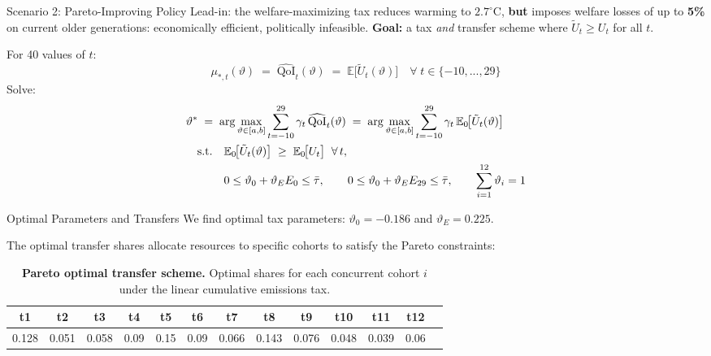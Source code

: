 \documentclass[10pt,aspectratio=169]{beamer}
\begin{document}
\begin{frame}{Scenario 2: Pareto-Improving Policy}
\footnotesize
Lead-in: the welfare-maximizing tax reduces warming to $2.7^\circ$C, \textbf{but} imposes welfare losses of up to \textbf{5\%} on current older generations: economically efficient, politically infeasible. \textbf{Goal:} a tax \textit{and} transfer scheme where $\tilde{U}_t \ge U_t$ for all $t$.

\vspace{0.2em}
For 40 values of $t$:
\begin{equation}
    \mu_{*,t}(\vartheta) \;=\; \widehat{\mathrm{QoI}}_t(\vartheta)
  \;=\;
  \mathbb{E}\!\bigl[\tilde{U}_t(\vartheta)\bigr] \quad \forall \; t \in \{-10,...,29\}
\end{equation}
Solve:
\begin{equation}
\label{eq:opt_pareto_y2}
\begin{aligned}
  &\vartheta^{\ast}
  \;=\;
  \arg\max_{\vartheta\in[a,b]}
  \sum_{t=-10}^{29}\gamma_t\, \widehat{\mathrm{QoI}}_t(\vartheta)
  \;=\;
  \arg\max_{\vartheta\in[a,b]}
  \sum_{t=-10}^{29}\gamma_t\,\mathbb{E}_0\!\bigl[\tilde{U}_t(\vartheta)\bigr] \\
& \quad \text{s.t.} \quad
 \mathbb{E}_0\!\bigl[\tilde{U}_t(\vartheta)\bigr]
  \;\ge\;
  \mathbb{E}_0\!\bigl[U_t\bigr]
  \;\;\forall\,t, \\
& \phantom{\quad \text{s.t.} \quad} 0 \leq \vartheta_0 + \vartheta_E  E_0 \leq \Bar{\tau}, \qquad
 0 \leq \vartheta_0 + \vartheta_E  E_{29} \leq \Bar{\tau},  \qquad
 \sum_{i=1}^{12} \vartheta_i = 1
\end{aligned}
\end{equation}
\end{frame}

\begin{frame}{Optimal Parameters and Transfers}
We find optimal tax parameters: $\vartheta_0 = -0.186$ and $\vartheta_E = 0.225$.\newline

The optimal transfer shares allocate resources to specific cohorts to satisfy the Pareto constraints:
\begin{table}[htbp]
\begin{small}
        \centering
    \begin{tabular}{|c|c|c|c|c|c|c|c|c|c|c|c|c|}
        \hline
        \textbf{t1} & \textbf{t2} & \textbf{t3} & \textbf{t4} & \textbf{t5} & \textbf{t6} & \textbf{t7} & \textbf{t8} & \textbf{t9} & \textbf{t10} & \textbf{t11} & \textbf{t12} \\
        \hline
        0.128 & 0.051 & 0.058 & 0.09 & 0.15 & 0.09 & 0.066 & 0.143 & 0.076 & 0.048 & 0.039 & 0.06 \\
        \hline
    \end{tabular}
    \caption{\textbf{Pareto optimal transfer scheme.} Optimal shares for each concurrent cohort $i$ under the linear cumulative emissions tax.}
    \label{tab:optimal_transfer_lin_S}
    \end{small}
\end{table}
\end{frame}
\end{document}
